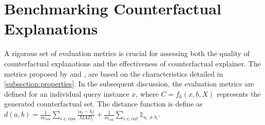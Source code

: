 \section{Benchmarking Counterfactual Explanations} \label{subsection:metrics}
A rigorous set of evaluation metrics is crucial for assessing both the quality of counterfactual explanations and the effectiveness of counterfactual explainer. The metrics proposed by \citet{guidotti2024counterfactual} and \citet{visani2022statistical}, are based on the characteristics detailed in \ref{subsection:properties}. In the subsequent discussion, the evaluation metrics are defined for an individual query instance $x$, where $C = f_k(x, b, X)$ represents the generated counterfactual set. The distance function is define as \(d(a, b) = \frac{1}{m_{con}} \sum_{i \in con} \frac{|a_i - b_i|}{MAD_i} + \frac{1}{m_{cat}} \sum_{i \in cat} \mathbb{1}_{a_i \neq b_i}\).

